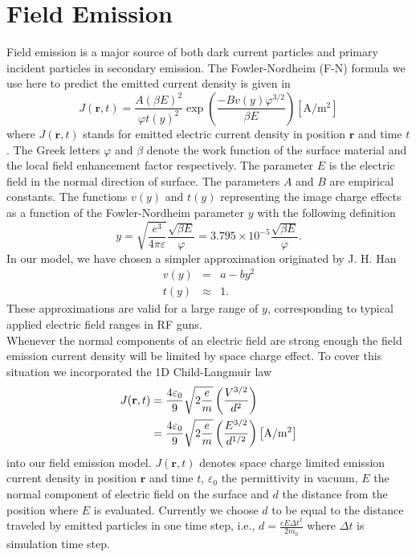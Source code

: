 

\chapter{Field Emission}
\label{chp:femiss}
Field emission is a major source of both dark current particles and primary
incident particles in secondary emission. The Fowler-Nordheim (F-N) formula
we use here to predict the emitted current density is given in 
\cite{BC} \cite{FN}
%
\begin{equation}\label{eq:units}
    J(\mathbf{r},t) = \frac{A(\beta E)^2}{\varphi t(y)^2}
                      \exp{\left(\frac{-B v(y)\varphi^{3/2}}{\beta E}\right)}
                      \left[\mathrm{A/m^2}\right]
\end{equation}
%
where $J(\mathbf{r},t)$ stands for emitted electric current density in position
$\mathbf{r}$ and time $t$. The Greek letters $\varphi$ and $\beta$ denote the
work function of the surface material and the local field enhancement factor
respectively. The parameter $E$ is the electric field in the normal direction
of surface. The parameters $A$ and $B$ are empirical constants. The functions
$v(y)$ and $t(y)$ representing the image charge effects \cite{BC} as a function
of the Fowler-Nordheim parameter $y$ with the following definition\cite{DE}
%
\begin{equation}\label{eq:imagecharge}
    y = \sqrt{\frac{e^3}{4\pi\varepsilon}}\frac{\sqrt{\beta E}}{\varphi}
      = 3.795\times10^{-5}\frac{\sqrt{\beta E}}{\varphi} \text{.}
\end{equation}
%
In our model, we have chosen a simpler approximation originated by J. H. Han\cite{DE}
\begin{eqnarray*}
v(y) &=& a-by^2 \\
t(y) &\approx& 1 \text{.}
\end{eqnarray*}
These approximations are valid for a large range of $y$, corresponding to
typical applied electric field ranges in RF guns.\\

Whenever the normal components of an electric field are strong enough the field
emission current density will be limited by space charge effect\cite{BC}.
To cover this situation we incorporated the 1D Child-Langmuir law
%
\begin{align}\label{eq:SpaceCharge}
    J(\mathbf{r},t) & =\frac{4\varepsilon_0}{9}\sqrt{2\frac{e}{m}}\left(\frac{V^{3/2}}{d^2}\right)\notag\\
    &
    =\frac{4\varepsilon_0}{9}\sqrt{2\frac{e}{m}}\left(\frac{E^{3/2}}{d^{1/2}}\right)
    \left[\mathrm{A/m^2}\right]
\end{align}
%
into our field emission model. $J(\mathbf{r},t)$ denotes space charge limited emission
current density in position $\mathbf{r}$ and time $t$, $\varepsilon_0$ the
permittivity in vacuum, $E$ the normal component of electric field on the surface
and $d$ the distance from the position where $E$ is evaluated. Currently we
choose $d$ to be equal to the distance traveled by emitted particles in one
time step, i.e., $d=\frac{\displaystyle eE\Delta{t}^2}{\displaystyle 2m_0}$ where $\Delta{t}$ is simulation
time step.

